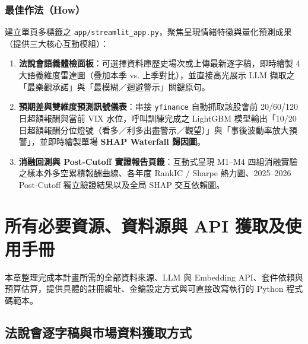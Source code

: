 \documentclass[11pt, a4paper]{article}
\begin{document}
\subsubsection{最佳作法（How）}
建立單頁多標籤之 \texttt{app/streamlit\_app.py}，聚焦呈現情緒特徵與量化預測成果（提供三大核心互動模組）：
\begin{enumerate}[leftmargin=1.5em, itemsep=2pt]
    \item \textbf{法說會語義體檢面板}：可選擇資料庫歷史場次或上傳最新逐字稿，即時繪製 4 大語義維度雷達圖（疊加本季 vs. 上季對比），並直接高光展示 LLM 擷取之「最樂觀承諾」與「最模糊／迴避警示」關鍵原句。
    \item \textbf{預期差與雙維度預測訊號儀表}：串接 \texttt{yfinance} 自動抓取該股會前 20/60/120 日超額報酬與當前 VIX 水位，呼叫訓練完成之 LightGBM 模型輸出「10/20 日超額報酬分位燈號（看多／利多出盡警示／觀望）」與「事後波動率放大預警」，並即時繪製單場 \textbf{SHAP Waterfall 歸因圖}。
    \item \textbf{消融回測與 Post-Cutoff 實證報告頁籤}：互動式呈現 M1--M4 四組消融實驗之樣本外多空累積報酬曲線、各年度 RankIC / Sharpe 熱力圖、2025--2026 Post-Cutoff 獨立驗證結果以及全局 SHAP 交互依賴圖。
\end{enumerate}

\clearpage
\section{所有必要資源、資料源與 API 獲取及使用手冊}

本章整理完成本計畫所需的全部資料來源、LLM 與 Embedding API、套件依賴與預算估算，提供具體的註冊網址、金鑰設定方式與可直接改寫執行的 Python 程式碼範本。

\subsection{法說會逐字稿與市場資料獲取方式}
\end{document}
